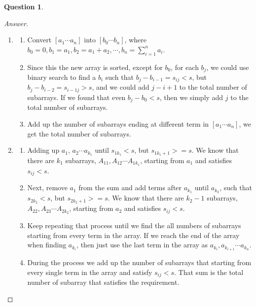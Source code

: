 \documentclass{article}
\theoremstyle{plain}
\newtheorem{question}{Question}
\newenvironment{answer}[1][Answer]
    {\begin{proof}[#1]{$ $}\renewcommand\qedsymbol{$\vartriangle$}}
    {\end{proof}}
\begin{document}
\begin{question}
\end{question}
\begin{answer}
    \begin{enumerate}
        \item
        \begin{enumerate}
            \item
            Convert $[a_1 \cdots a_n]$ into $[b_0 \cdots b_n]$, where $\displaystyle b_0 = 0, b_1 = a_1, b_2 = a_1 + a_2, \cdots ,b_n = \sum_{i=1}^{n} a_i$.
            \item
            Since this the new array is sorted, except for $b_0$, for each $b_j$, we could use binary search to find a $b_i$ such that $b_j - b_{i-1} = s_{ij} < s$, but $b_j - b_{i-2} = s_{i-1j} > s$, and we could add $j-i+1$ to the total number of subarrays. If we found that even $b_j - b_0 < s$, then we simply add $j$ to the total number of subarrays.
            \item
            Add up the number of subarrays ending at different term in $[a_1 \cdots a_n]$, we get the total number of subarrays.
        \end{enumerate}
        \item
        \begin{enumerate}
            \item
            Adding up $a_1$, $a_2 \cdots a_{k_1}$ until $s_{1k_1} < s$, but $s_{1k_1+1} >= s$. We know that there are $k_1$ subarrays, $A_{11}, A_{12} \cdots A_{1k_1}$, starting from $a_1$ and satisfies $s_{ij} < s$.
            \item
            Next, remove $a_1$ from the sum and add terms after $a_{k_1}$ until $a_{k_2}$, such that $s_{2k_2} < s$, but $s_{2k_2+1} >= s$. We know that there are $k_2 - 1$ subarrays, $A_{22}, A_{23} \cdots A_{2k_2}$, starting from $a_2$ and satisfies $s_{ij} < s$.
            \item
            Keep repeating that process until we find the all numbers of subarrays starting from every term in the array. If we reach the end of the array when finding $a_{k_i}$, then just use the last term in the array as $a_{k_i}, a_{k_{i+1}} \cdots a_{k_n}$.
            \item
            During the process we add up the number of subarrays that starting from every single term in the array and satisfy $s_{ij} < s$. That sum is the total number of subarray that satisfies the requirement.
        \end{enumerate}
    \end{enumerate}
\end{answer}
\end{document}
